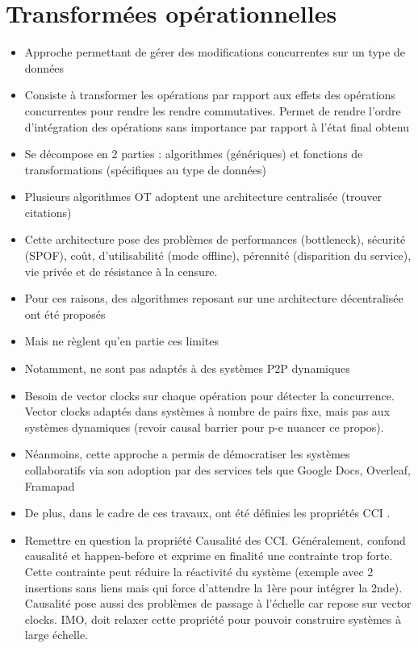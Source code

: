 \documentclass[12pt]{thesul}
\begin{document}
\section{Transformées opérationnelles}

\begin{itemize}
  \item Approche permettant de gérer des modifications concurrentes sur un type de données
  \item Consiste à transformer les opérations par rapport aux effets des opérations concurrentes pour rendre les rendre commutatives.
    Permet de rendre l'ordre d'intégration des opérations sans importance par rapport à l'état final obtenu
  \item Se décompose en 2 parties : algorithmes (génériques) et fonctions de transformations (spécifiques au type de données)
  \item Plusieurs algorithmes OT adoptent une architecture centralisée (trouver citations)
  \item Cette architecture pose des problèmes de performances (bottleneck), sécurité (SPOF), coût, d'utilisabilité (mode offline), pérennité (disparition du service), vie privée et de résistance à la censure.
  \item Pour ces raisons, des algorithmes reposant sur une architecture décentralisée ont été proposés
  \item Mais ne règlent qu'en partie ces limites
  \item Notamment, ne sont pas adaptés à des systèmes P2P dynamiques
  \item Besoin de vector clocks sur chaque opération pour détecter la concurrence.
    Vector clocks adaptés dans systèmes à nombre de pairs fixe, mais pas aux systèmes dynamiques (revoir causal barrier pour p-e nuancer ce propos).
  \item Néanmoins, cette approche a permis de démocratiser les systèmes collaboratifs via son adoption par des services tels que Google Docs, Overleaf, Framapad
  \item De plus, dans le cadre de ces travaux, ont été définies les propriétés CCI \cite{10.1145/274444.274447}.
  \item Remettre en question la propriété Causalité des CCI.
    Généralement, confond causalité et happen-before et exprime en finalité une contrainte trop forte.
    Cette contrainte peut réduire la réactivité du système (exemple avec 2 insertions sans liens mais qui force d'attendre la 1ère pour intégrer la 2nde).
    Causalité pose aussi des problèmes de passage à l'échelle car repose sur vector clocks.
    IMO, doit relaxer cette propriété pour pouvoir construire systèmes à large échelle.
\end{itemize}
\end{document}
